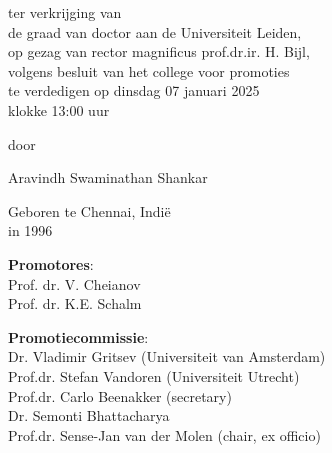 \begin{titlepage}
\begin{center}
    
     {\large ter verkrijging van \\ de graad van doctor aan de Universiteit Leiden, \\ op gezag van rector magnificus prof.dr.ir. H. Bijl, \\ volgens besluit van het college voor promoties \\ te verdedigen op dinsdag 07 januari 2025 \\ klokke 13:00  uur}
	
	\vspace{3\baselineskip} %
	
    {\large door}  %
    
    \vspace{3\baselineskip} %
    
	{\Large Aravindh Swaminathan Shankar}
    
    
    {\large Geboren te Chennai, Indi{\"e}\\in 1996}
    
	\vfill %
\end{center}

\clearpage
\thispagestyle{empty}

\medskip
\noindent \textbf{Promotores}:\\
Prof. dr. V. Cheianov\\
Prof. dr. K.E. Schalm 

\bigskip
\noindent \textbf{Promotiecommissie}: \\
Dr. Vladimir Gritsev (Universiteit van Amsterdam)\\
Prof.dr. Stefan Vandoren (Universiteit Utrecht)\\
Prof.dr. Carlo Beenakker (secretary)\\
Dr. Semonti Bhattacharya \\
Prof.dr. Sense-Jan van der Molen (chair, ex officio)\\






\end{titlepage}

